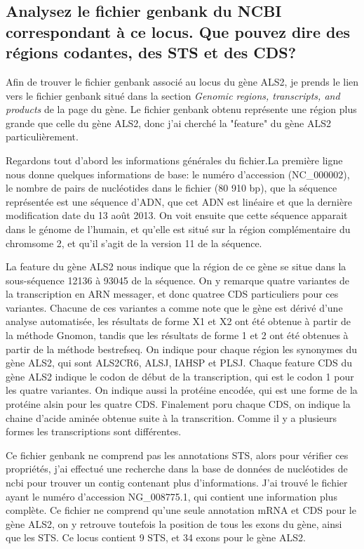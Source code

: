 \documentclass[11pt]{article} %
\begin{document}
\subsection[Fichier genbank du gène ALS2]{Analysez le fichier genbank du NCBI correspondant à ce locus. Que pouvez dire des
régions codantes, des STS et des CDS?}

Afin de trouver le fichier genbank associé au locus du gène ALS2, je prends le lien vers le fichier genbank situé dans la section
\emph{Genomic regions, transcripts, and products} de la page du gène. Le fichier genbank obtenu représente une région plus
grande que celle du gène ALS2, donc j'ai cherché la "feature" du gène ALS2 particulièrement.

Regardons tout d'abord les informations générales du fichier.La première ligne nous donne quelques informations de base: le numéro
d'accession (NC\_000002), le nombre de pairs de nucléotides dans le fichier (80 910 bp), que la séquence représentée est une séquence
d'ADN, que cet ADN est linéaire et que la dernière modification date du 13 août 2013. On voit ensuite que cette séquence apparait 
dans le génome de l'humain, et qu'elle est situé sur la région complémentaire du chromsome 2, et qu'il s'agit de la version 11 de la
séquence.

La feature du gène ALS2 nous indique que la région de ce gène se situe dans la sous-séquence 12136 à  93045 de la séquence. On y 
remarque quatre variantes de la transcription en ARN messager, et donc quatree CDS particuliers pour ces variantes.
Chacune de ces variantes a comme note que le gène est dérivé d'une analyse automatisée, les résultats de forme X1 et X2 ont été
obtenue à partir de la méthode Gnomon, tandis que les résultats de forme 1 et 2 ont été obtenues à partir de la méthode
bestrefseq. On indique pour chaque région les synonymes du gène ALS2, qui sont ALS2CR6, ALSJ, IAHSP et PLSJ. Chaque feature CDS
du gène ALS2 indique le codon de début de la transcription, qui est le codon 1 pour les quatre variantes. On indique aussi la
protéine encodée, qui est une forme de la protéine alsin pour les quatre CDS. Finalement poru chaque CDS, on indique la
chaine d'acide aminée obtenue suite à la transcrition. Comme il y a plusieurs formes les transcriptions sont différentes.

Ce fichier genbank ne comprend pas les annotations STS, alors pour vérifier ces propriétés, j'ai effectué une recherche dans la
base de données de nucléotides de ncbi pour trouver un contig contenant plus d'informations. J'ai trouvé le fichier ayant le
numéro d'accession NG\_008775.1, qui contient une information plus complète. Ce fichier ne comprend qu'une seule annotation mRNA
et CDS pour le gène ALS2, on y retrouve toutefois la position de tous les exons du gène, ainsi que les STS. Ce locus contient
9 STS, et 34 exons pour le gène ALS2. 
\end{document}
